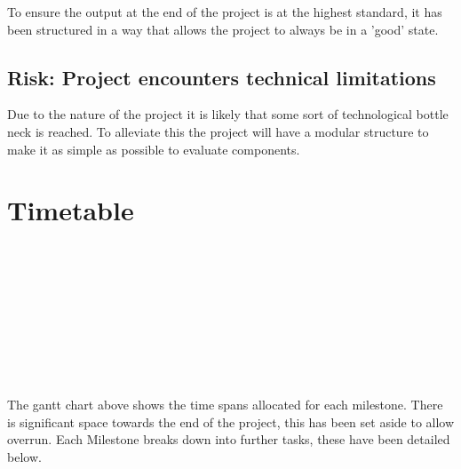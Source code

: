 \documentclass[a4paper,12pt,notitlepage]{article}
\begin{document}
To ensure the output at the end of the project is at the highest standard, it has
been structured in a way that allows the project to always be in a 'good' state.

\subsection*{Risk: Project encounters technical limitations}
Due to the nature of the project it is likely that some sort of technological 
bottle neck is reached. To alleviate this the project will have a modular 
structure to make it as simple as possible to evaluate components.

\section{Timetable}

\begin{ganttchart}[vgrid, hgrid, time slot modifier=0,x unit=0.8cm]{15}
	 \\
	
	 \\

	 \\
	 \\
	 \\
	 \\
	 \\
	 \\
\end{ganttchart}

The gantt chart above shows the time spans allocated for each milestone. There is
significant space towards the end of the project, this has been set aside to
allow overrun. Each Milestone breaks down into further tasks, these have been
detailed below.
\end{document}
